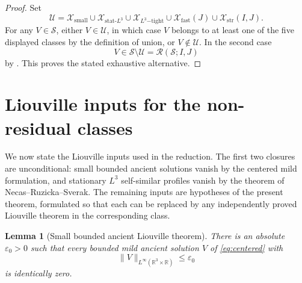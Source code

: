 \documentclass[11pt]{amsart}
\theoremstyle{plain}
\newtheorem{lemma}[theorem]{Lemma}
\theoremstyle{definition}
\theoremstyle{remark}
\numberwithin{equation}{section}
\begin{document}
\begin{proof}
Set
\[
   \mathcal U
   =
   \mathcal X_{\mathrm{small}}
   \cup
   \mathcal X_{\mathrm{stat}\text{-}L^3}
   \cup
   \mathcal X_{L^3\mathrm{-tight}}
   \cup
   \mathcal X_{\mathrm{fast}}(J)
   \cup
   \mathcal X_{\mathrm{str}}(I,J).
\]
For any \(V\in\mathcal S\), either \(V\in\mathcal U\), in which case \(V\)
belongs to at least one of the five displayed classes by the definition of
union, or \(V\notin\mathcal U\).  In the second case
\[
   V\in\mathcal S\setminus\mathcal U
   =
   \mathcal R(\mathcal S;I,J)
\]
by .  This proves the stated exhaustive alternative.
\end{proof}

\section{Liouville inputs for the non-residual classes}

We now state the Liouville inputs used in the reduction.  The first two
closures are unconditional: small bounded ancient solutions vanish by the
centered mild formulation, and stationary \(L^3\) self-similar profiles vanish
by the theorem of Necas--Ruzicka--Sverak.  The remaining inputs are hypotheses
of the present theorem, formulated so that each can be replaced by any
independently proved Liouville theorem in the corresponding class.

\begin{lemma}[Small bounded ancient Liouville theorem]
\label{lem:small-liouville}
There is an absolute \(\varepsilon_0>0\) such that every bounded mild ancient
solution \(V\) of \eqref{eq:centered} with
\[
   \|V\|_{L^\infty(\mathbb R^3\times\mathbb R)}\le\varepsilon_0
\]
is identically zero.
\end{lemma}
\end{document}
